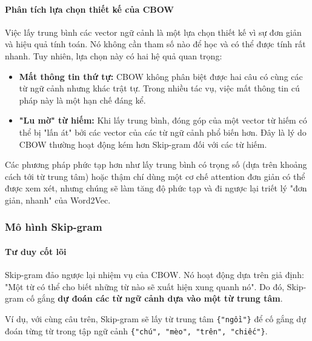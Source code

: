 \paragraph{Phân tích lựa chọn thiết kế của CBOW}
Việc lấy trung bình các vector ngữ cảnh là một lựa chọn thiết kế vì sự đơn giản và hiệu quả tính toán. Nó không cần tham số nào để học và có thể được tính rất nhanh. Tuy nhiên, lựa chọn này có hai hệ quả quan trọng:
\begin{itemize}
    \item \textbf{Mất thông tin thứ tự:} CBOW không phân biệt được hai câu có cùng các từ ngữ cảnh nhưng khác trật tự. Trong nhiều tác vụ, việc mất thông tin cú pháp này là một hạn chế đáng kể.
    \item \textbf{"Lu mờ" từ hiếm:} Khi lấy trung bình, đóng góp của một vector từ hiếm có thể bị "lấn át" bởi các vector của các từ ngữ cảnh phổ biến hơn. Đây là lý do CBOW thường hoạt động kém hơn Skip-gram đối với các từ hiếm.
\end{itemize}
Các phương pháp phức tạp hơn như lấy trung bình có trọng số (dựa trên khoảng cách tới từ trung tâm) hoặc thậm chí dùng một cơ chế attention đơn giản có thể được xem xét, nhưng chúng sẽ làm tăng độ phức tạp và đi ngược lại triết lý "đơn giản, nhanh" của Word2Vec.

\subsubsection{Mô hình Skip-gram}
\paragraph{Tư duy cốt lõi}
Skip-gram đảo ngược lại nhiệm vụ của CBOW. Nó hoạt động dựa trên giả định: "Một từ có thể cho biết những từ nào sẽ xuất hiện xung quanh nó". Do đó, Skip-gram cố gắng \textbf{dự đoán các từ ngữ cảnh dựa vào một từ trung tâm}.

Ví dụ, với cùng câu trên, Skip-gram sẽ lấy từ trung tâm \texttt{\{"ngồi"\}} để cố gắng dự đoán từng từ trong tập ngữ cảnh \texttt{\{"chú", "mèo", "trên", "chiếc"\}}.

